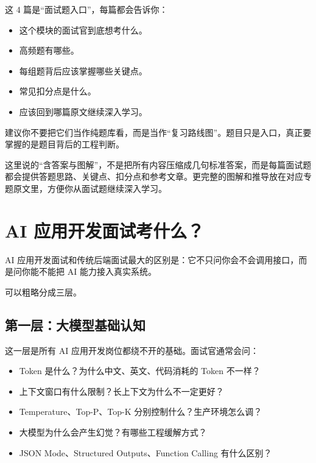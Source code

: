 \documentclass[10pt,a4paper]{ctexart}
\begin{document}
这 4 篇是“面试题入口”，每篇都会告诉你：


\begin{itemize}[itemsep=2pt, topsep=4pt]
  \item 这个模块的面试官到底想考什么。
  \item 高频题有哪些。
  \item 每组题背后应该掌握哪些关键点。
  \item 常见扣分点是什么。
  \item 应该回到哪篇原文继续深入学习。
\end{itemize}


建议你不要把它们当作纯题库看，而是当作“复习路线图”。题目只是入口，真正要掌握的是题目背后的工程判断。



这里说的“含答案与图解”，不是把所有内容压缩成几句标准答案，而是每篇面试题都会提供答题思路、关键点、扣分点和参考文章。更完整的图解和推导放在对应专题原文里，方便你从面试题继续深入学习。



\section{AI 应用开发面试考什么？}


AI 应用开发面试和传统后端面试最大的区别是：它不只问你会不会调用接口，而是问你能不能把 AI 能力接入真实系统。



可以粗略分成三层。



\subsection{第一层：大模型基础认知}


这一层是所有 AI 应用开发岗位都绕不开的基础。面试官通常会问：


\begin{itemize}[itemsep=2pt, topsep=4pt]
  \item Token 是什么？为什么中文、英文、代码消耗的 Token 不一样？
  \item 上下文窗口有什么限制？长上下文为什么不一定更好？
  \item Temperature、Top-P、Top-K 分别控制什么？生产环境怎么调？
  \item 大模型为什么会产生幻觉？有哪些工程缓解方式？
  \item JSON Mode、Structured Outputs、Function Calling 有什么区别？
\end{itemize}
\end{document}
